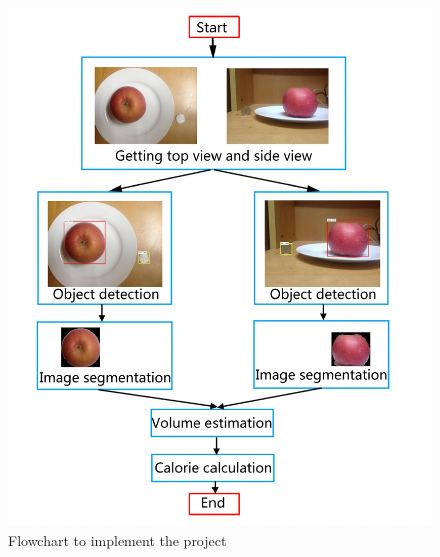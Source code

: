 \documentclass[12pt, a4paper, twoside]{article}
\begin{document}
\begin{figure}[p]
	\centering
	\includegraphics[width=\textwidth]{roadmap}
	\caption{Flowchart to implement the project\cite{liang}}
	\label{F:roadmap}
\end{figure}

\printbibliography
\end{document}
